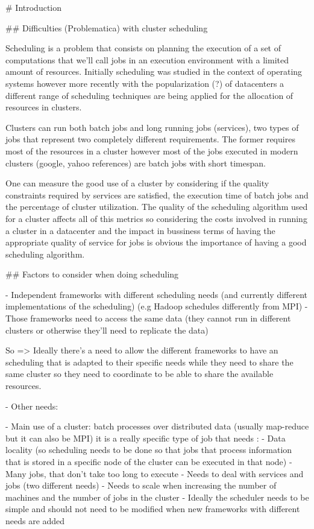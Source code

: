 
# Introduction

## Difficulties (Problematica) with cluster scheduling

Scheduling is a problem that consists on planning the execution of a
set of computations that we'll call jobs in an execution environment
with a limited amount of resources. Initially scheduling was studied
in the context of operating systems however more recently with the
popularization (?) of datacenters a different range of scheduling
techniques are being applied for the allocation of resources in
clusters. 

Clusters can run both batch jobs and long running jobs (services), two
types of jobs that represent two completely different requirements.
The former requires most of the resources in a cluster however most of
the jobs executed in modern clusters (google, yahoo references) are
batch jobs with short timespan.

One can measure the good use of a cluster by considering if the
quality constraints required by services are satisfied, the execution
time of batch jobs and the percentage of cluster utilization. The
quality of the scheduling algorithm used for a cluster affects all of
this metrics so considering the costs involved in running a cluster in
a datacenter and the impact in bussiness terms of having the
appropriate quality of service for jobs is obvious the importance of
having a good scheduling algorithm. 


## Factors to consider when doing scheduling

- Independent frameworks with different scheduling needs (and
  currently different implementations  of the scheduling) (e.g Hadoop
  schedules differently from MPI)
- Those frameworks need to access the same data (they cannot run in
different clusters or otherwise they'll need to replicate the data)

So => Ideally there's a need to allow the different frameworks to have an
scheduling that is adapted to their specific needs while they need to
share the same cluster so they need to coordinate to be able to share
the available resources.

- Other needs:

 - Main use of a cluster: batch processes over distributed data
   (usually map-reduce but it can also be MPI) it is a really specific
   type of job that needs :
     - Data locality (so scheduling needs to be done so that jobs that
     process information that is stored in a specific node of the
     cluster can be executed in that node)
     - Many jobs, that don't take too long to execute
 - Needs to deal with services and jobs (two different needs)
 - Needs to scale when increasing the number of machines and the
   number of jobs in the cluster
 - Ideally the scheduler needs to be simple and should not need to be
   modified when new frameworks with different needs are added

